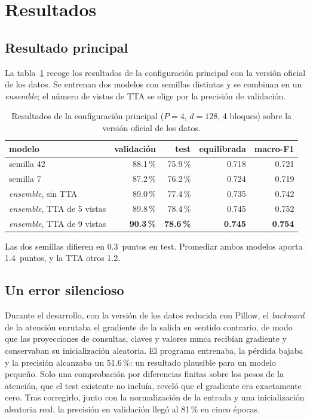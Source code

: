 \documentclass[11pt,a4paper]{article}
\begin{document}
\section{Resultados}

\subsection{Resultado principal}

La tabla~\ref{tab:principal} recoge los resultados de la configuración
principal con la versión oficial de los datos. Se entrenan dos modelos con
semillas distintas y se combinan en un \emph{ensemble}; el número de vistas de
TTA se elige por la precisión de validación.

\begin{table}[H]
  \centering\small
  \begin{tabular}{lrrrr}
    \toprule
    modelo & validación & test & equilibrada & macro-F1 \\
    \midrule
    semilla 42                         & 88.1\,\% & 75.9\,\% & 0.718 & 0.721 \\
    semilla 7                          & 87.2\,\% & 76.2\,\% & 0.724 & 0.719 \\
    \emph{ensemble}, sin TTA            & 89.0\,\% & 77.4\,\% & 0.735 & 0.742 \\
    \emph{ensemble}, TTA de 5 vistas    & 89.8\,\% & 78.4\,\% & 0.745 & 0.752 \\
    \emph{ensemble}, TTA de 9 vistas    & \textbf{90.3\,\%} & \textbf{78.6\,\%} & \textbf{0.745} & \textbf{0.754} \\
    \bottomrule
  \end{tabular}
  \caption{Resultados de la configuración principal ($P=4$, $d=128$, 4 bloques)
           sobre la versión oficial de los datos.}
  \label{tab:principal}
\end{table}

Las dos semillas difieren en 0.3~puntos en test. Promediar ambos modelos aporta
1.4~puntos, y la TTA otros 1.2.

\subsection{Un error silencioso}

Durante el desarrollo, con la versión de los datos reducida con Pillow, el
\emph{backward} de la atención
enrutaba el gradiente de la salida en sentido contrario, de modo que las
proyecciones de consultas, claves y valores nunca recibían gradiente y
conservaban su inicialización aleatoria. El programa entrenaba, la pérdida
bajaba y la precisión alcanzaba un 51.6\,\%: un resultado plausible para un
modelo pequeño. Solo una comprobación por diferencias finitas sobre los pesos
de la atención, que el test existente no incluía, reveló que el gradiente era
exactamente cero. Tras corregirlo, junto con la normalización de la entrada y
una inicialización aleatoria real, la precisión en validación llegó al 81\,\%
en cinco épocas.
\end{document}
